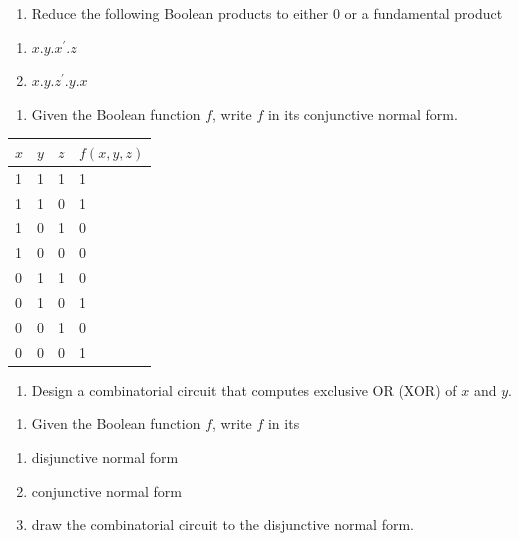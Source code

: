 \documentclass[]{book}
\providecommand{\tightlist}{%
  \setlength{\itemsep}{0pt}\setlength{\parskip}{0pt}}
\begin{document}
\begin{enumerate}
\def\labelenumi{\arabic{enumi}.}
\setcounter{enumi}{13}
\tightlist
\item
  Reduce the following Boolean products to either 0 or a fundamental product
\end{enumerate}

\begin{enumerate}
\def\labelenumi{(\alph{enumi})}
\tightlist
\item
  \(x.y.x^\prime.z\)
\item
  \(x.y.z^\prime.y.x\)
\end{enumerate}

\begin{enumerate}
\def\labelenumi{\arabic{enumi}.}
\setcounter{enumi}{14}
\tightlist
\item
  Given the Boolean function \(f\), write \(f\) in its conjunctive normal form.
\end{enumerate}

\begin{longtable}[]{@{}llll@{}}
\toprule
\(x\) & \(y\) & \(z\) & \(f(x,y,z)\)\tabularnewline
\midrule
\endhead
1 & 1 & 1 & 1\tabularnewline
1 & 1 & 0 & 1\tabularnewline
1 & 0 & 1 & 0\tabularnewline
1 & 0 & 0 & 0\tabularnewline
0 & 1 & 1 & 0\tabularnewline
0 & 1 & 0 & 1\tabularnewline
0 & 0 & 1 & 0\tabularnewline
0 & 0 & 0 & 1\tabularnewline
\bottomrule
\end{longtable}

\newpage

\begin{enumerate}
\def\labelenumi{\arabic{enumi}.}
\setcounter{enumi}{15}
\tightlist
\item
  Design a combinatorial circuit that computes exclusive OR (XOR) of \(x\) and \(y\).
\end{enumerate}

\begin{enumerate}
\def\labelenumi{\arabic{enumi}.}
\setcounter{enumi}{16}
\tightlist
\item
  Given the Boolean function \(f\), write \(f\) in its
\end{enumerate}

\begin{enumerate}
\def\labelenumi{(\alph{enumi})}
\tightlist
\item
  disjunctive normal form
\item
  conjunctive normal form
\item
  draw the combinatorial circuit to the disjunctive normal form.
\end{enumerate}
\end{document}
